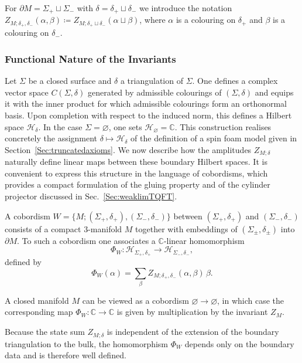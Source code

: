 \documentclass[11pt]{article}
\theoremstyle{definition}
\numberwithin{equation}{section}
\begin{document}
For $\partial M=\Sigma_+ \sqcup \Sigma_-$ with $\delta=\delta_+ \sqcup \delta_-$ we introduce the notation $Z_{M;\delta_+,\delta_-}(\alpha,\beta)\coloneqq Z_{M;\delta_+ \sqcup \delta_-}(\alpha \sqcup\beta)$, where $\alpha$ is a colouring on $\delta_+$ and $\beta$ is a colouring on $\delta_-$.

\subsubsection{Functional Nature of the Invariants}

Let $\Sigma$ be a closed surface and $\delta$ a triangulation of $\Sigma$. 
One defines a complex vector space $C(\Sigma,\delta)$ generated by admissible colourings of $(\Sigma,\delta)$ and equips it with the inner product for which admissible colourings form an orthonormal basis. 
Upon completion with respect to the induced norm, this defines a Hilbert space $\mathcal H_{\delta}$.
In the case $\Sigma=\varnothing$, one sets $\mathcal H_\varnothing=\mathbb{C}$. This construction realises concretely the assignment $\delta\mapsto\mathcal H_\delta$ of the definition of a spin foam model given in Section~\ref{Sec:truncatedaxioms}. 
We now describe how the amplitudes $Z_{M;\delta}$ naturally define linear maps between these boundary Hilbert spaces. 
It is convenient to express this structure in the language of cobordisms, which provides a compact formulation of the gluing property and of the cylinder projector discussed in Sec.~\ref{Sec:weaklimTQFT}.

A cobordism $W=\{M;(\Sigma_+,\delta_+),(\Sigma_-,\delta_-)\}$ between $(\Sigma_+,\delta_+)$ and $(\Sigma_-,\delta_-)$ consists of a compact $3$-manifold $M$ together with embeddings of $(\Sigma_\pm,\delta_\pm)$ into $\partial M$. 
To such a cobordism one associates a $\mathbb{C}$-linear homomorphism
\begin{equation}
\Phi_W : \mathcal H_{\Sigma_+,\delta_+} \to \mathcal H_{\Sigma_-,\delta_-},
\end{equation}
defined by
\begin{equation}
\label{eq:PhiQ}
\Phi_W(\alpha)=\sum_\beta Z_{M;\delta_+,\delta_-}(\alpha,\beta)\,\beta.
\end{equation}

A closed manifold $M$ can be viewed as a cobordism $\varnothing \to \varnothing$, in which case the corresponding map $\Phi_W:\mathbb{C}\to \mathbb{C}$ is given by multiplication by the invariant $Z_M$.

Because the state sum $Z_{M;\delta}$ is independent of the extension of the boundary triangulation to the bulk, the homomorphism $\Phi_W$ depends only on the boundary data and is therefore well defined.
\end{document}
